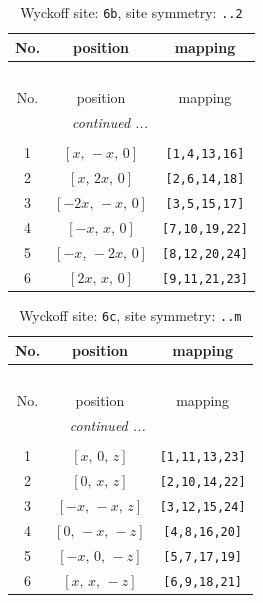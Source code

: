 \documentclass[fleqn,8pt]{jsarticle}
\begin{document}
\begin{longtable}{ccc}
\caption{Wyckoff site: {\tt 6b}, site symmetry: {\tt ..2}}
 \\
 \hline \hline
No. & position & mapping \\ \hline \endfirsthead

\multicolumn{2}{l}{\tablename\ \thetable{}} \\
 \hline \hline
No. & position & mapping \\ \hline \endhead

 \hline \hline
\multicolumn{2}{r}{\footnotesize\it continued ...} \\ \endfoot

 \hline \hline
\multicolumn{2}{r}{} \\ \endlastfoot

1 & $\left[ x,\, - x,\, 0 \right]$ & {\tt [1,4,13,16]} \\ \hline
2 & $\left[ x,\, 2 x,\, 0 \right]$ & {\tt [2,6,14,18]} \\ \hline
3 & $\left[ - 2 x,\, - x,\, 0 \right]$ & {\tt [3,5,15,17]} \\ \hline
4 & $\left[ - x,\, x,\, 0 \right]$ & {\tt [7,10,19,22]} \\ \hline
5 & $\left[ - x,\, - 2 x,\, 0 \right]$ & {\tt [8,12,20,24]} \\ \hline
6 & $\left[ 2 x,\, x,\, 0 \right]$ & {\tt [9,11,21,23]} \\
\end{longtable}
\renewcommand{\arraystretch}{1.2}
\begin{longtable}{ccc}
\caption{Wyckoff site: {\tt 6c}, site symmetry: {\tt ..m}}
 \\
 \hline \hline
No. & position & mapping \\ \hline \endfirsthead

\multicolumn{2}{l}{\tablename\ \thetable{}} \\
 \hline \hline
No. & position & mapping \\ \hline \endhead

 \hline \hline
\multicolumn{2}{r}{\footnotesize\it continued ...} \\ \endfoot

 \hline \hline
\multicolumn{2}{r}{} \\ \endlastfoot

1 & $\left[ x,\, 0,\, z \right]$ & {\tt [1,11,13,23]} \\ \hline
2 & $\left[ 0,\, x,\, z \right]$ & {\tt [2,10,14,22]} \\ \hline
3 & $\left[ - x,\, - x,\, z \right]$ & {\tt [3,12,15,24]} \\ \hline
4 & $\left[ 0,\, - x,\, - z \right]$ & {\tt [4,8,16,20]} \\ \hline
5 & $\left[ - x,\, 0,\, - z \right]$ & {\tt [5,7,17,19]} \\ \hline
6 & $\left[ x,\, x,\, - z \right]$ & {\tt [6,9,18,21]} \\
\end{longtable}
\end{document}
